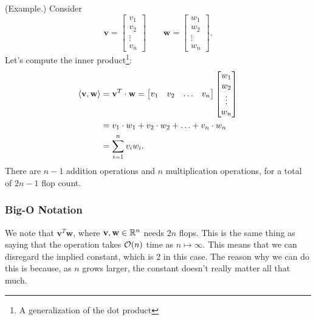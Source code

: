 \documentclass[letterpaper]{article}
\newcommand{\0}{\mathbf{0}}
\begin{document}
\begin{mdframed}
    (Example.) Consider 
    \[\mathbf{v} = \begin{bmatrix}
        v_1 \\ v_2 \\ \vdots \\ v_n
    \end{bmatrix} \qquad \mathbf{w} = \begin{bmatrix}
        w_1 \\ w_2 \\ \vdots \\ w_n
    \end{bmatrix}.\]
    Let's compute the inner product\footnote{A generalization of the dot product}:
    \begin{equation*}
        \begin{aligned}
            \langle \mathbf{v}, \mathbf{w} \rangle &= \mathbf{v}^T \cdot \mathbf{w} = \begin{bmatrix}
                v_1 & v_2 & \hdots & v_n
            \end{bmatrix} \begin{bmatrix}
                w_1 \\ w_2 \\ \vdots \\ w_n
            \end{bmatrix} \\ 
                &= v_1 \cdot w_1 + v_2 \cdot w_2 + \hdots + v_n \cdot w_n \\ 
                &= \sum_{i = 1}^{n} v_i w_i.
        \end{aligned}
    \end{equation*}
    There are $n - 1$ addition operations and $n$ multiplication operations, for a total of $2n - 1$ flop count.
\end{mdframed}

\subsubsection{Big-O Notation}
We note that $\mathbf{v}^T \mathbf{w}$, where $\mathbf{v}, \mathbf{w} \in \mathbb{R}^n$ needs $2n$ flops. This is the same thing as saying that the operation takes $\mathcal{O}(n)$ time as $n \mapsto \infty$. This means that we can disregard the implied constant, which is 2 in this case. The reason why we can do this is because, as $n$ grows larger, the constant doesn't really matter all that much. 

\bigskip 
\end{document}

